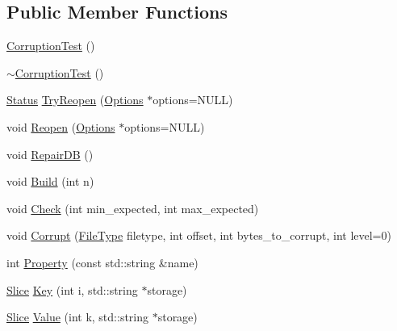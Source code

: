 \subsection*{Public Member Functions}
\begin{DoxyCompactItemize}
\item 
\hyperlink{classleveldb_1_1_corruption_test_a9940767db260b1e4e60b8bcedc50217c}{Corruption\+Test} ()
\item 
\hyperlink{classleveldb_1_1_corruption_test_a4086f02f771d78d4ce242c14b0e392d9}{$\sim$\+Corruption\+Test} ()
\item 
\hyperlink{classleveldb_1_1_status}{Status} \hyperlink{classleveldb_1_1_corruption_test_af9680fa87bfaf020fc47966c1d2467e8}{Try\+Reopen} (\hyperlink{structleveldb_1_1_options}{Options} $\ast$options=N\+U\+L\+L)
\item 
void \hyperlink{classleveldb_1_1_corruption_test_aab4c6a5ca8757d5e62caaf66e90d8f8f}{Reopen} (\hyperlink{structleveldb_1_1_options}{Options} $\ast$options=N\+U\+L\+L)
\item 
void \hyperlink{classleveldb_1_1_corruption_test_aff36b45496c39a006a14df201ef7d57b}{Repair\+D\+B} ()
\item 
void \hyperlink{classleveldb_1_1_corruption_test_a54d2114311c61356e879b5ccfc3cda18}{Build} (int n)
\item 
void \hyperlink{classleveldb_1_1_corruption_test_aa03dcde1d0771ebbcf7d6ac8bda9c725}{Check} (int min\+\_\+expected, int max\+\_\+expected)
\item 
void \hyperlink{classleveldb_1_1_corruption_test_a78823f8dd0b878a1707de1179558a5ab}{Corrupt} (\hyperlink{namespaceleveldb_ab8e559ac5cadcb2b5dd531c60df944f1}{File\+Type} filetype, int offset, int bytes\+\_\+to\+\_\+corrupt, int level=0)
\item 
int \hyperlink{classleveldb_1_1_corruption_test_aab1ed767d1cdac7e95a32ccf6defc709}{Property} (const std\+::string \&name)
\item 
\hyperlink{classleveldb_1_1_slice}{Slice} \hyperlink{classleveldb_1_1_corruption_test_a157c0095fca3c0a2ccaf3b8647705469}{Key} (int i, std\+::string $\ast$storage)
\item 
\hyperlink{classleveldb_1_1_slice}{Slice} \hyperlink{classleveldb_1_1_corruption_test_a0afb6030faf43287b86e027a13eac152}{Value} (int k, std\+::string $\ast$storage)
\end{DoxyCompactItemize}
